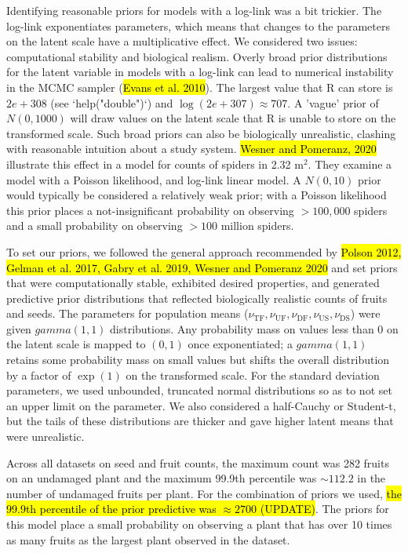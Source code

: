 \documentclass[12pt, oneside, titlepage]{article}   	%
\begin{document}
Identifying reasonable priors for models with a log-link was a bit trickier. The log-link exponentiates parameters, which means that changes to the parameters on the latent scale have a multiplicative effect. We considered two issues: computational stability and biological realism. Overly broad prior distributions for the latent variable in models with a log-link can lead to numerical instability in the MCMC sampler (\hl{Evans et al. 2010}). The largest value that R can store is $2e+308$ (see `help("double")`) and $\log(2e+307) \approx 707$. A 'vague' prior of $N(0,1000)$ will draw values on the latent scale that R is unable to store on the transformed scale. Such broad priors can also be biologically unrealistic, clashing with reasonable intuition about a study system. \hl{Wesner and Pomeranz, 2020} illustrate this effect in a model for counts of spiders in 2.32 $\mathrm{m}^2$. They examine a model with a Poisson likelihood, and log-link linear model. A $N(0,10)$ prior would typically be considered a relatively weak prior; with a Poisson likelihood this prior places a not-insignificant probability on observing $>100,000$ spiders and a small probability on observing $>100$ million spiders. 

To set our priors, we followed the general approach recommended by \hl{Polson 2012, Gelman et al. 2017, Gabry et al. 2019, Wesner and Pomeranz 2020} and set priors that were computationally stable, exhibited desired properties, and generated predictive prior distributions that reflected biologically realistic counts of fruits and seeds. The parameters for population means ($\nu_\mathrm{TF},\nu_\mathrm{UF},\nu_\mathrm{DF},\nu_\mathrm{US},\nu_\mathrm{DS}$) were given $gamma(1,1)$ distributions. Any probability mass on values less than 0 on the latent scale is mapped to $(0,1)$ once exponentiated; a $gamma(1,1)$ retains some probability mass on small values but shifts the overall distribution by a factor of $\exp(1)$ on the transformed scale. For the standard deviation parameters, we used unbounded, truncated normal distributions so as to not set an upper limit on the parameter. We also considered a half-Cauchy or Student-t, but the tails of these distributions are thicker and gave higher latent means that were unrealistic.

Across all datasets on seed and fruit counts, the maximum count was 282 fruits on an undamaged plant and the maximum 99.9th percentile was $\sim112.2$ in the number of undamaged fruits per plant. For the combination of priors we used, \hl{the 99.9th percentile of the prior predictive was $\approx 2700$ (UPDATE)}. The priors for this model place a small probability on observing a plant that has over 10 times as many fruits as the largest plant observed in the dataset. 
\end{document}
